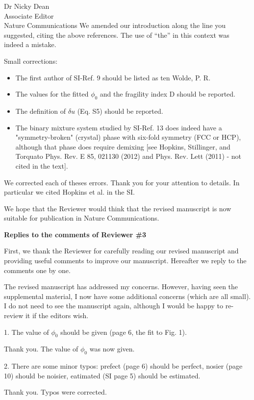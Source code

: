 \documentclass[a4paper, rebuttal, parskip=true, firsthead=false, fromemail=true, foldmarks=false]{scrlttr2}
\begin{document}
\begin{letter}{Dr Nicky Dean\\
Associate Editor\\
Nature Communications}
We amended our introduction along the line you suggested, citing the above references. The use of ``the'' in this context was indeed a mistake.

\begin{quotationi}
Small corrections:
\begin{itemize}
\item The first author of SI-Ref. 9 should be listed as ten Wolde, P. R.
\item The values for the fitted $\phi_0$ and the fragility index D should be reported.
\item The definition of $\delta u$ (Eq. S5) should be reported.
\item The binary mixture system studied by SI-Ref. 13 does indeed have a "symmetry-broken" (crystal) phase with six-fold symmetry (FCC or HCP), although that phase does require demixing [see Hopkins, Stillinger, and Torquato Phys. Rev. E 85, 021130 (2012) and Phys. Rev. Lett (2011) - not cited in the text].
\end{itemize}
\end{quotationi}

We corrected each of theses errors. Thank you for your attention to details. In particular we cited Hopkins et al. in the SI.

We hope that the Reviewer would think that the revised manuscript is now suitable for publication in Nature Communications. 
 
\clearpage

\textsf{\textbf{Replies to the comments of Reviewer \#3}}

First, we thank the Reviewer for carefully reading our revised manuscript and providing useful comments to improve our manuscript. Hereafter we reply to the comments one by one. 

\begin{quotationi}
The revised manuscript has addressed my concerns. However, having seen the supplemental material, I now have some additional concerns (which are all small). I do not need to see the manuscript again, although I would be happy to re-review it if the editors wish. 

1. The value of $\phi_0$ should be given (page 6, the fit to Fig. 1). 
\end{quotationi}
Thank you. The value of $\phi_0$ was now given. 

\begin{quotationi}
2. There are some minor typos: prefect (page 6) should be perfect, nosier (page 10) should be noisier, eatimated (SI page 5) should be estimated.
\end{quotationi}
Thank you. Typos were corrected.


\end{letter}
\end{document}
